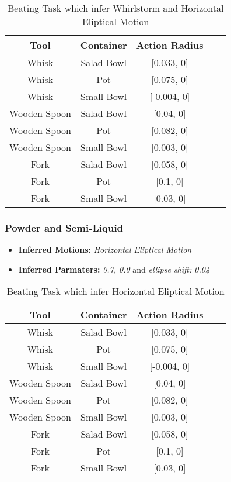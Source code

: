 \begin{table}[H]
    \centering
    \begin{tabular}{|c|c|c|c|c|}
    \hline
    \textbf{Tool} & \textbf{Container} & \textbf{Action Radius}\\
    \hline
    Whisk & Salad Bowl & [0.033, 0] \\
    \hline
    Whisk & Pot & [0.075, 0] \\
    \hline
    Whisk & Small Bowl & [-0.004, 0]\\
    \hline
    Wooden Spoon & Salad Bowl & [0.04, 0] \\
    \hline
    Wooden Spoon & Pot & [0.082, 0] \\
    \hline
    Wooden Spoon & Small Bowl & [0.003, 0] \\
    \hline
    Fork & Salad Bowl & [0.058, 0] \\
    \hline
    Fork & Pot & [0.1, 0] \\
    \hline
    Fork & Small Bowl & [0.03, 0] \\
    \hline
\end{tabular}
\caption{Beating Task which infer Whirlstorm and Horizontal Eliptical Motion}

\end{table}

\subsubsection*{Powder and Semi-Liquid}
\begin{itemize}
    \item \textbf{Inferred Motions:} \textit{Horizontal Eliptical Motion}
    \item \textbf{Inferred Parmaters:} \textit{0.7, 0.0} and \textit{ellipse shift: 0.04}
\end{itemize}
  
\begin{table}[H]
    \centering
    \begin{tabular}{|c|c|c|c|c|}
    \hline
    \textbf{Tool} & \textbf{Container} & \textbf{Action Radius}\\
    \hline
    Whisk & Salad Bowl & [0.033, 0] \\
    \hline
    Whisk & Pot & [0.075, 0] \\
    \hline
    Whisk & Small Bowl & [-0.004, 0]\\
    \hline
    Wooden Spoon & Salad Bowl & [0.04, 0] \\
    \hline
    Wooden Spoon & Pot & [0.082, 0] \\
    \hline
    Wooden Spoon & Small Bowl & [0.003, 0] \\
    \hline
    Fork & Salad Bowl & [0.058, 0] \\
    \hline
    Fork & Pot & [0.1, 0] \\
    \hline
    Fork & Small Bowl & [0.03, 0] \\
    \hline
\end{tabular}
\caption{Beating Task which infer Horizontal Eliptical Motion}

\end{table}



